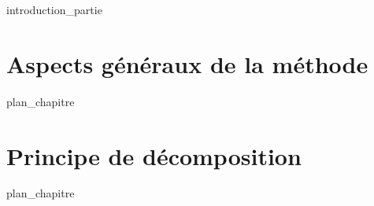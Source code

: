 \label{part:02_int}
{introduction_partie}
%
\chapter{Aspects généraux de la méthode }
\label{chap:04}
{plan_chapitre}
%
\chapter{Principe de décomposition }
\label{chap:05}
{plan_chapitre}
